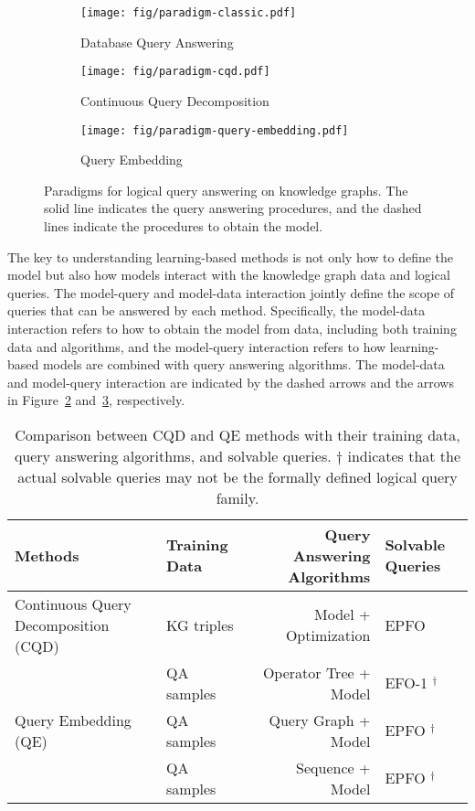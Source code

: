 \documentclass[11pt]{article}
\begin{document}
\begin{figure}[t]
	\centering
	\begin{subfigure}[b]{0.31\textwidth}
		\centering
		\texttt{[image: fig/paradigm-classic.pdf]}
		\caption{Database Query Answering}
		\label{subfig:dbqa}
	\end{subfigure}
	\hfill
	\begin{subfigure}[b]{0.32\textwidth}
		\centering
		\texttt{[image: fig/paradigm-cqd.pdf]}
		\caption{Continuous Query Decomposition}
		\label{subfig:cqd}
	\end{subfigure}
	\hfill
	\begin{subfigure}[b]{0.32\textwidth}
		\centering
		\texttt{[image: fig/paradigm-query-embedding.pdf]}
		\caption{Query Embedding}
		\label{subfig:query-emb}
	\end{subfigure}
	\caption{Paradigms for logical query answering on knowledge graphs. The solid line indicates the query answering procedures, and the dashed lines indicate the procedures to obtain the model.}
	\label{fig:old-and-new-paradigms}
\end{figure}

The key to understanding learning-based methods is not only how to define the model but also how models interact with the knowledge graph data and logical queries. The model-query and model-data interaction jointly define the scope of queries that can be answered by each method. Specifically, the model-data interaction refers to how to obtain the model from data, including both training data and algorithms, and the model-query interaction refers to how learning-based models are combined with query answering algorithms. The model-data and model-query interaction are indicated by the dashed arrows and the arrows in Figure~\ref{subfig:cqd} and~\ref{subfig:query-emb}, respectively. 


\begin{table}[t]
\small\centering
\caption{Comparison between CQD and QE methods with their training data, query answering algorithms, and solvable queries. $\dag$ indicates that the actual solvable queries may not be the formally defined logical query family.}\label{tab:compare-method}
\begin{tabular}{llrl}
\toprule
Methods                        & Training Data & Query Answering Algorithms & Solvable Queries \\ \midrule
Continuous Query Decomposition (CQD)
  & KG triples                     & Model + Optimization          & EPFO             \\\midrule
\multirow{3}{*}{Query Embedding (QE)} & QA samples & Operator Tree + Model & EFO-1 $^\dag$ \\
                                 & QA samples & Query Graph + Model & EPFO $^\dag$ \\
                                 & QA samples & Sequence + Model & EPFO $^\dag$  \\ \bottomrule
\end{tabular}
\end{table}
\end{document}

